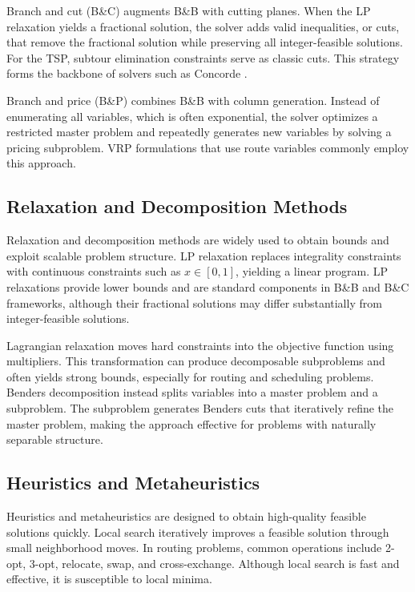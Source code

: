 Branch and cut (B\&C) augments B\&B with cutting planes. When the LP relaxation yields a
fractional solution, the solver adds valid inequalities, or cuts, that remove the fractional
solution while preserving all integer-feasible solutions. For the TSP, subtour elimination
constraints serve as classic cuts. This strategy forms the backbone of solvers such as
Concorde \citep{applegate2006traveling}.

Branch and price (B\&P) combines B\&B with column generation. Instead of enumerating all
variables, which is often exponential, the solver optimizes a restricted master problem and
repeatedly generates new variables by solving a pricing subproblem. VRP formulations that use
route variables commonly employ this approach.

\subsection{Relaxation and Decomposition Methods}
\label{subsec:relaxation-decomposition}

Relaxation and decomposition methods are widely used to obtain bounds and exploit scalable
problem structure. LP relaxation replaces integrality constraints with continuous constraints
such as $x \in [0,1]$, yielding a linear program. LP relaxations provide lower bounds and are
standard components in B\&B and B\&C frameworks, although their fractional solutions may differ
substantially from integer-feasible solutions.

Lagrangian relaxation moves hard constraints into the objective function using multipliers.
This transformation can produce decomposable subproblems and often yields strong bounds,
especially for routing and scheduling problems. Benders decomposition instead splits variables
into a master problem and a subproblem. The subproblem generates Benders cuts that iteratively
refine the master problem, making the approach effective for problems with naturally separable
structure.

\subsection{Heuristics and Metaheuristics}
\label{subsec:heuristics-metaheuristics}

Heuristics and metaheuristics are designed to obtain high-quality feasible solutions quickly.
Local search iteratively improves a feasible solution through small neighborhood moves. In
routing problems, common operations include 2-opt, 3-opt, relocate, swap, and cross-exchange.
Although local search is fast and effective, it is susceptible to local minima.

